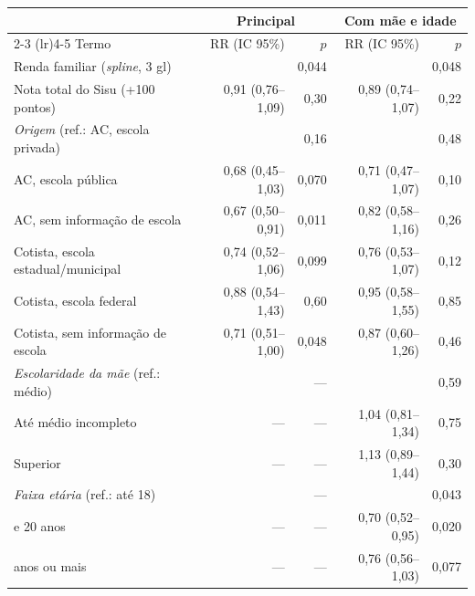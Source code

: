 \begin{tabular}{lrrrr}
\toprule
& \multicolumn{2}{c}{Principal} & \multicolumn{2}{c}{Com mãe e idade} \\
\cmidrule(lr){2-3} \cmidrule(lr){4-5}
Termo & RR (IC 95\%) & $p$ & RR (IC 95\%) & $p$ \\
\midrule
Renda familiar (\textit{spline}, 3 gl) &  & 0,044 &  & 0,048 \\
Nota total do Sisu (+100 pontos) & 0,91 (0,76--1,09) & 0,30 & 0,89 (0,74--1,07) & 0,22 \\
\addlinespace
\textit{Origem} (ref.: AC, escola privada) &  & 0,16 &  & 0,48 \\
\quad AC, escola pública & 0,68 (0,45--1,03) & 0,070 & 0,71 (0,47--1,07) & 0,10 \\
\quad AC, sem informação de escola & 0,67 (0,50--0,91) & 0,011 & 0,82 (0,58--1,16) & 0,26 \\
\quad Cotista, escola estadual/municipal & 0,74 (0,52--1,06) & 0,099 & 0,76 (0,53--1,07) & 0,12 \\
\quad Cotista, escola federal & 0,88 (0,54--1,43) & 0,60 & 0,95 (0,58--1,55) & 0,85 \\
\quad Cotista, sem informação de escola & 0,71 (0,51--1,00) & 0,048 & 0,87 (0,60--1,26) & 0,46 \\
\addlinespace
\textit{Escolaridade da mãe} (ref.: médio) &  & --- &  & 0,59 \\
\quad Até médio incompleto & --- & --- & 1,04 (0,81--1,34) & 0,75 \\
\quad Superior & --- & --- & 1,13 (0,89--1,44) & 0,30 \\
\addlinespace
\textit{Faixa etária} (ref.: até 18) &  & --- &  & 0,043 \\
\quad 19 e 20 anos & --- & --- & 0,70 (0,52--0,95) & 0,020 \\
\quad 21 anos ou mais & --- & --- & 0,76 (0,56--1,03) & 0,077 \\
\bottomrule
\end{tabular}

